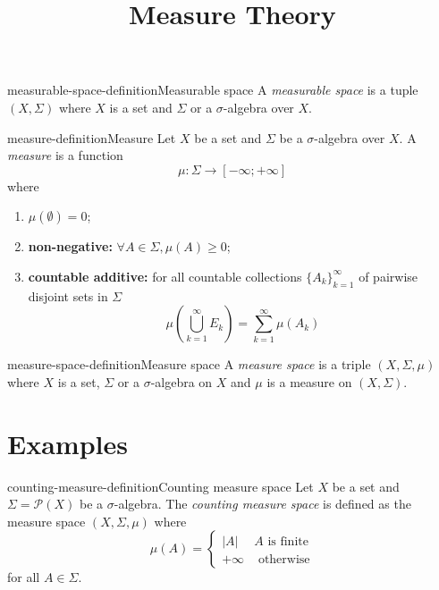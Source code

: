 \documentclass[preview]{standalone}
\begin{document}
\title{Measure Theory}
\genpage


\begin{snippetdefinition}{measurable-space-definition}{Measurable space}
    A \textit{measurable space} is a tuple \((X, \Sigma)\)
    where \(X\) is a set and \(\Sigma\) or a \(\sigma\)-algebra over \(X\).
\end{snippetdefinition}

\begin{snippetdefinition}{measure-definition}{Measure}
    Let \(X\) be a set and \(\Sigma\) be a \(\sigma\)-algebra over \(X\).
    A \textit{measure} is a function
    \[
        \mu\colon \Sigma \to [-\infty; + \infty]
    \]
    where
    \begin{enumerate}
        \item \(\mu(\emptyset) = 0\);
        \item \textbf{non-negative:} \(\forall A \in \Sigma, \mu(A) \geq 0\);
        \item \textbf{countable additive:} for all countable collections \({\{A_k\}}_{k=1}^\infty\)
        of pairwise disjoint sets in \(\Sigma\)
        \[
            \mu\left( \bigcup_{k=1}^\infty E_k \right)
            =
            \sum_{k=1}^\infty \mu(A_k)
        \]
    \end{enumerate}
\end{snippetdefinition}

\begin{snippetdefinition}{measure-space-definition}{Measure space}
    A \textit{measure space} is a triple \((X, \Sigma, \mu)\)
    where \(X\) is a set, \(\Sigma\) or a \(\sigma\)-algebra on \(X\)
    and \(\mu\) is a measure on \((X, \Sigma)\).
\end{snippetdefinition}

\section{Examples}

\begin{snippetdefinition}{counting-measure-definition}{Counting measure space}
    Let \(X\) be a set and \(\Sigma = \mathcal{P}(X)\) be a \(\sigma\)-algebra.
    The \textit{counting measure space}
    is defined as the measure space \((X, \Sigma, \mu)\)
    where
    \[
        \mu(A) = \begin{cases}
            |A| & A \text{ is finite} \\
            +\infty & \text{ otherwise}
        \end{cases}
    \]
    for all \(A \in \Sigma\).
\end{snippetdefinition}

\end{document}

